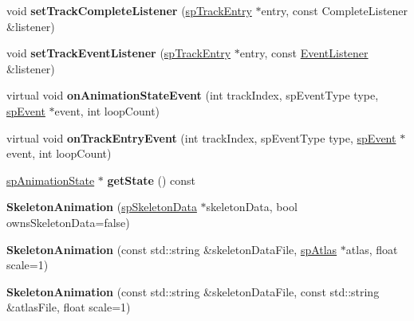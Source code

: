 \begin{DoxyCompactItemize}
void {\bfseries set\+Track\+Complete\+Listener} (\hyperlink{structspTrackEntry}{sp\+Track\+Entry} $\ast$entry, const Complete\+Listener \&listener)
\item 
\mbox{\label{classspine_1_1SkeletonAnimation_a9f6037a941dbdcf0833982e7cbf72c4e}} 
void {\bfseries set\+Track\+Event\+Listener} (\hyperlink{structspTrackEntry}{sp\+Track\+Entry} $\ast$entry, const \hyperlink{classEventListener}{Event\+Listener} \&listener)
\item 
\mbox{\label{classspine_1_1SkeletonAnimation_a1631c943ec64f4d81be657d2985c5c50}} 
virtual void {\bfseries on\+Animation\+State\+Event} (int track\+Index, sp\+Event\+Type type, \hyperlink{structspEvent}{sp\+Event} $\ast$event, int loop\+Count)
\item 
\mbox{\label{classspine_1_1SkeletonAnimation_aa486f2f95f1ae553a593d855eaa72817}} 
virtual void {\bfseries on\+Track\+Entry\+Event} (int track\+Index, sp\+Event\+Type type, \hyperlink{structspEvent}{sp\+Event} $\ast$event, int loop\+Count)
\item 
\mbox{\label{classspine_1_1SkeletonAnimation_a4db2df31ea821ce7279058a49bc72d64}} 
\hyperlink{structspAnimationState}{sp\+Animation\+State} $\ast$ {\bfseries get\+State} () const
\item 
\mbox{\label{classspine_1_1SkeletonAnimation_a027d884c95423cbee5516b87bc273d2b}} 
{\bfseries Skeleton\+Animation} (\hyperlink{structspSkeletonData}{sp\+Skeleton\+Data} $\ast$skeleton\+Data, bool owns\+Skeleton\+Data=false)
\item 
\mbox{\label{classspine_1_1SkeletonAnimation_a5af9459c6fbf3a5a684c94033f7b575a}} 
{\bfseries Skeleton\+Animation} (const std\+::string \&skeleton\+Data\+File, \hyperlink{structspAtlas}{sp\+Atlas} $\ast$atlas, float scale=1)
\item 
\mbox{\label{classspine_1_1SkeletonAnimation_a2873ce8c7d5c6e0e95d7ffb6f4b4a188}} 
{\bfseries Skeleton\+Animation} (const std\+::string \&skeleton\+Data\+File, const std\+::string \&atlas\+File, float scale=1)

\end{DoxyCompactItemize}
